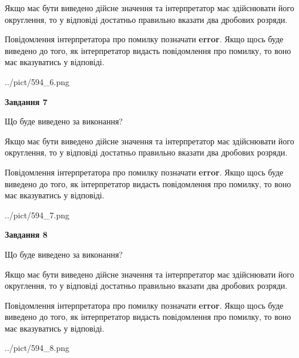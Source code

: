\documentclass[12pt, ukrainian]{article}
\begin{document}
{\begin {Large}
Якщо має бути виведено дійсне значення та інтерпретатор має здійснювати його округлення, 
то у відповіді достатньо правильно вказати два дробових розряди.

Повідомлення інтерпретатора про помилку позначати \textbf{error}.
Якщо щось буде виведено до того, як інтерпретатор видасть повідомлення про помилку, 
то воно має вказуватись у відповіді. \par

\begin{center}
	{../pict/594_6.png}
\end{center}
\newpage

{\begin {center}\textbf{Завдання 7}\end {center}}\par
Що буде виведено за виконання? \par

Якщо має бути виведено дійсне значення та інтерпретатор має здійснювати його округлення, 
то у відповіді достатньо правильно вказати два дробових розряди.

Повідомлення інтерпретатора про помилку позначати \textbf{error}.
Якщо щось буде виведено до того, як інтерпретатор видасть повідомлення про помилку, 
то воно має вказуватись у відповіді. \par

\begin{center}
	{../pict/594_7.png}
\end{center}
\newpage

{\begin {center}\textbf{Завдання 8}\end {center}}\par
Що буде виведено за виконання? \par

Якщо має бути виведено дійсне значення та інтерпретатор має здійснювати його округлення, 
то у відповіді достатньо правильно вказати два дробових розряди.

Повідомлення інтерпретатора про помилку позначати \textbf{error}.
Якщо щось буде виведено до того, як інтерпретатор видасть повідомлення про помилку, 
то воно має вказуватись у відповіді. \par

\begin{center}
	{../pict/594_8.png}
\end{center}
\newpage


\end{Large}}
\end{document}
